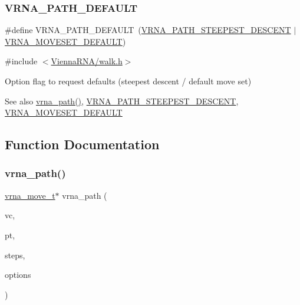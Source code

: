 \subsubsection{\texorpdfstring{V\+R\+N\+A\+\_\+\+P\+A\+T\+H\+\_\+\+D\+E\+F\+A\+U\+LT}{VRNA\_PATH\_DEFAULT}}
{\footnotesize\ttfamily \#define V\+R\+N\+A\+\_\+\+P\+A\+T\+H\+\_\+\+D\+E\+F\+A\+U\+LT~(\hyperlink{group__paths_ga705cea2b3243a38a2d6e3b1e141ed061}{V\+R\+N\+A\+\_\+\+P\+A\+T\+H\+\_\+\+S\+T\+E\+E\+P\+E\+S\+T\+\_\+\+D\+E\+S\+C\+E\+NT} $\vert$ \hyperlink{group__neighbors_gaa5ffec4dd0d02df320f123e6888154d1}{V\+R\+N\+A\+\_\+\+M\+O\+V\+E\+S\+E\+T\+\_\+\+D\+E\+F\+A\+U\+LT})}



{\ttfamily \#include $<$\hyperlink{walk_8h}{Vienna\+R\+N\+A/walk.\+h}$>$}



Option flag to request defaults (steepest descent / default move set) 

\begin{DoxySeeAlso}{See also}
\hyperlink{group__paths_ga327c96463d698e7863508499cacce9ab}{vrna\+\_\+path()}, \hyperlink{group__paths_ga705cea2b3243a38a2d6e3b1e141ed061}{V\+R\+N\+A\+\_\+\+P\+A\+T\+H\+\_\+\+S\+T\+E\+E\+P\+E\+S\+T\+\_\+\+D\+E\+S\+C\+E\+NT}, \hyperlink{group__neighbors_gaa5ffec4dd0d02df320f123e6888154d1}{V\+R\+N\+A\+\_\+\+M\+O\+V\+E\+S\+E\+T\+\_\+\+D\+E\+F\+A\+U\+LT} 
\end{DoxySeeAlso}


\subsection{Function Documentation}
\mbox{\label{group__paths_ga327c96463d698e7863508499cacce9ab}} 
\subsubsection{\texorpdfstring{vrna\+\_\+path()}{vrna\_path()}}
{\footnotesize\ttfamily \hyperlink{group__neighbors_structvrna__move__s}{vrna\+\_\+move\+\_\+t}$\ast$ vrna\+\_\+path (\begin{DoxyParamCaption}\item[{\hyperlink{group__fold__compound_ga1b0cef17fd40466cef5968eaeeff6166}{vrna\+\_\+fold\+\_\+compound\+\_\+t} $\ast$}]{vc,  }\item[{short $\ast$}]{pt,  }\item[{unsigned int}]{steps,  }\item[{unsigned int}]{options }\end{DoxyParamCaption})}



